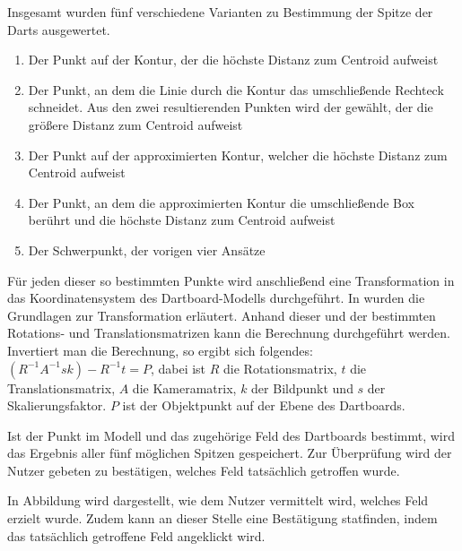 Insgesamt wurden fünf verschiedene Varianten zu Bestimmung der Spitze der Darts ausgewertet. 
\begin{enumerate}
	\item Der Punkt auf der Kontur, der die höchste Distanz zum Centroid aufweist
	\item Der Punkt, an dem die Linie durch die Kontur das umschließende Rechteck schneidet. Aus den zwei resultierenden Punkten wird der gewählt, der die größere Distanz zum Centroid aufweist
	\item Der Punkt auf der approximierten Kontur, welcher die höchste Distanz zum Centroid  aufweist
	\item Der Punkt, an dem die approximierten Kontur die umschließende Box berührt und die höchste Distanz zum Centroid aufweist
	\item Der Schwerpunkt, der vorigen vier Ansätze
\end{enumerate}

Für jeden dieser so bestimmten Punkte wird anschließend eine Transformation in das Koordinatensystem des Dartboard-Modells durchgeführt. In  wurden die Grundlagen zur Transformation erläutert. Anhand dieser und der bestimmten Rotations- und Translationsmatrizen kann die Berechnung durchgeführt werden. Invertiert man die Berechnung, so ergibt sich folgendes: 
$(R^{-1}A^{-1}sk)-R^{-1}t=P$, dabei ist $R$ die Rotationsmatrix, $t$ die Translationsmatrix, $A$ die Kameramatrix, $k$ der Bildpunkt und $s$ der Skalierungsfaktor. $P$ ist der Objektpunkt auf der Ebene des Dartboards.

Ist der Punkt im Modell und das zugehörige Feld des Dartboards bestimmt, wird das Ergebnis aller fünf möglichen Spitzen gespeichert. Zur Überprüfung wird der Nutzer gebeten zu bestätigen, welches Feld tatsächlich getroffen wurde. 

In Abbildung  wird dargestellt, wie dem Nutzer vermittelt wird, welches Feld erzielt wurde. Zudem kann an dieser Stelle eine Bestätigung statfinden, indem das tatsächlich getroffene Feld angeklickt wird.


